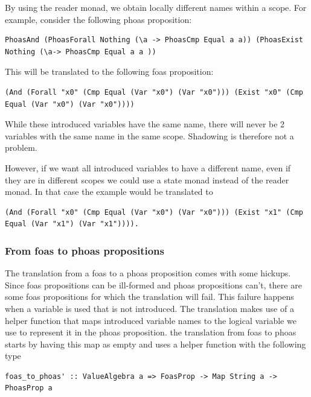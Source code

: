 By using the reader monad, we obtain locally different names within a scope. For example, consider the following phoas proposition:

\begin{verbatim}
PhoasAnd (PhoasForall Nothing (\a -> PhoasCmp Equal a a)) (PhoasExist Nothing (\a-> PhoasCmp Equal a a ))
\end{verbatim}

This will be translated to the following foas proposition:


\begin{verbatim}
(And (Forall "x0" (Cmp Equal (Var "x0") (Var "x0"))) (Exist "x0" (Cmp Equal (Var "x0") (Var "x0"))))
\end{verbatim}

While these introduced variables have the same name, there will never be 2 variables with the same name in the same scope. Shadowing is therefore not a problem.


However, if we want all introduced variables to have a different name, even if they are in different scopes we could use a state monad instead of the reader monad. In that case the example would be translated to
\begin{verbatim}
(And (Forall "x0" (Cmp Equal (Var "x0") (Var "x0"))) (Exist "x1" (Cmp Equal (Var "x1") (Var "x1")))).
\end{verbatim}


\subsubsection{From foas to phoas propositions}

The translation from a foas to a phoas proposition comes with some hickups. Since foas propositions can be ill-formed and phoas propositions can't, there are some foas propositions for which the translation will fail. This failure happens when a variable is used that is not introduced. The translation makes use of a helper function that maps introduced variable names to the logical variable we use to represent it in the phoas proposition. the translation from foas to phoas starts by having this map as empty and uses a helper function with the following type

\begin{verbatim}
foas_to_phoas' :: ValueAlgebra a => FoasProp -> Map String a -> PhoasProp a


\end{verbatim}


